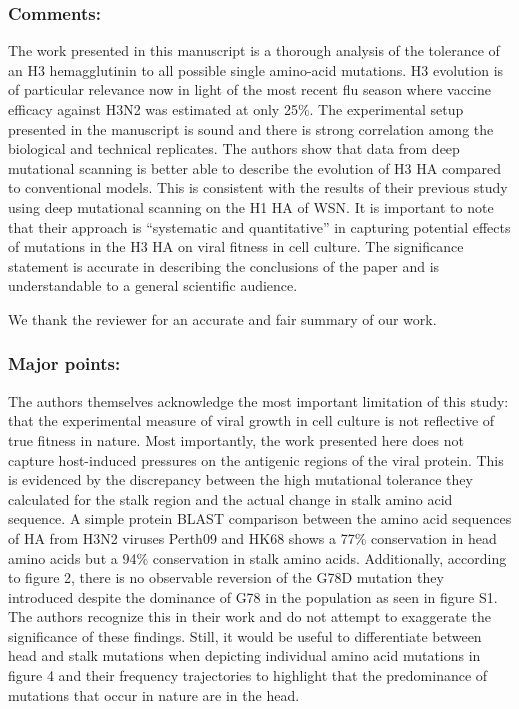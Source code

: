 \documentclass[11pt, oneside]{article}   	%
\newcommand{\response}[1]{{\color{black}#1}}
\begin{document}
\subsubsection*{Comments:} 
The work presented in this manuscript is a thorough analysis of the tolerance of an H3 hemagglutinin to all possible single amino-acid mutations. H3 evolution is of particular relevance now in light of the most recent flu season where vaccine efficacy against H3N2 was estimated at only 25\%. The experimental setup presented in the manuscript is sound and there is strong correlation among the biological and technical replicates. The authors show that data from deep mutational scanning is better able to describe the evolution of H3 HA compared to conventional models. This is consistent with the results of their previous study using deep mutational scanning on the H1 HA of WSN. It is important to note that their approach is ``systematic and quantitative'' in capturing potential effects of mutations in the H3 HA on viral fitness in cell culture. The significance statement is accurate in describing the conclusions of the paper and is understandable to a general scientific audience. 

\response{We thank the reviewer for an accurate and fair summary of our work.}

\subsubsection*{Major points:} 

The authors themselves acknowledge the most important limitation of this study: that the experimental measure of viral growth in cell culture is not reflective of true fitness in nature. Most importantly, the work presented here does not capture host-induced pressures on the antigenic regions of the viral protein. This is evidenced by the discrepancy between the high mutational tolerance they calculated for the stalk region and the actual change in stalk amino acid sequence. A simple protein BLAST comparison between the amino acid sequences of HA from H3N2 viruses Perth09 and HK68 shows a 77\% conservation in head amino acids but a 94\% conservation in stalk amino acids. Additionally, according to figure 2, there is no observable reversion of the G78D mutation they introduced despite the dominance of G78 in the population as seen in figure S1. The authors recognize this in their work and do not attempt to exaggerate the significance of these findings. Still, it would be useful to differentiate between head and stalk mutations when depicting individual amino acid mutations in figure 4 and their frequency trajectories to highlight that the predominance of mutations that occur in nature are in the head. 
\end{document}
